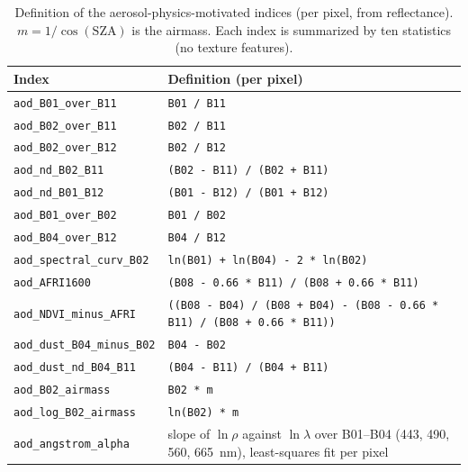 \documentclass[draft,ea]{agutexSI2019}
\begin{document}
\begin{table}
\caption{Definition of the aerosol-physics-motivated indices (per pixel, from reflectance). $m=1/\cos(\mathrm{SZA})$ is the airmass. Each index is summarized by ten statistics (no texture features).}
\centering
\scriptsize\baselineskip=9pt\normalbaselineskip=9pt
\begin{tabular}{l p{}}
\hline
Index & Definition (per pixel) \\
\hline
\texttt{aod\_B01\_over\_B11} & \texttt{B01 / B11} \\
\texttt{aod\_B02\_over\_B11} & \texttt{B02 / B11} \\
\texttt{aod\_B02\_over\_B12} & \texttt{B02 / B12} \\
\texttt{aod\_nd\_B02\_B11} & \texttt{(B02 - B11) / (B02 + B11)} \\
\texttt{aod\_nd\_B01\_B12} & \texttt{(B01 - B12) / (B01 + B12)} \\
\texttt{aod\_B01\_over\_B02} & \texttt{B01 / B02} \\
\texttt{aod\_B04\_over\_B12} & \texttt{B04 / B12} \\
\texttt{aod\_spectral\_curv\_B02} & \texttt{ln(B01) + ln(B04) - 2 * ln(B02)} \\
\texttt{aod\_AFRI1600} & \texttt{(B08 - 0.66 * B11) / (B08 + 0.66 * B11)} \\
\texttt{aod\_NDVI\_minus\_AFRI} & \texttt{((B08 - B04) / (B08 + B04) - (B08 - 0.66 * B11) / (B08 + 0.66 * B11))} \\
\texttt{aod\_dust\_B04\_minus\_B02} & \texttt{B04 - B02} \\
\texttt{aod\_dust\_nd\_B04\_B11} & \texttt{(B04 - B11) / (B04 + B11)} \\
\texttt{aod\_B02\_airmass} & \texttt{B02 * m} \\
\texttt{aod\_log\_B02\_airmass} & \texttt{ln(B02) * m} \\
\texttt{aod\_angstrom\_alpha} & slope of $\ln\rho$ against $\ln\lambda$ over B01--B04 (443, 490, 560, 665~nm), least-squares fit per pixel \\
\hline
\end{tabular}
\end{table}
\end{document}
